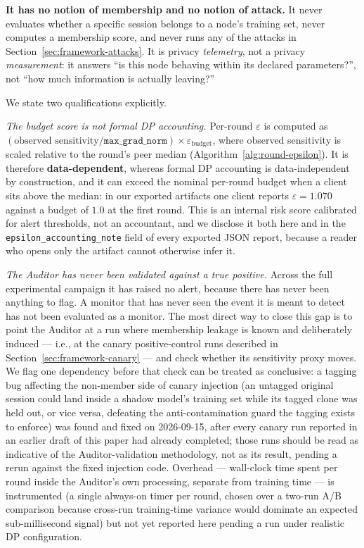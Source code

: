 \textbf{It has no notion of membership and no notion of attack.} It
never evaluates whether a specific session belongs to a node's training
set, never computes a membership score, and never runs any of the
attacks in Section~\ref{sec:framework-attacks}. It is privacy
\emph{telemetry}, not a privacy \emph{measurement}: it answers ``is
this node behaving within its declared parameters?'', not ``how much
information is actually leaving?''

We state two qualifications explicitly.

\emph{The budget score is not formal DP accounting.} Per-round
$\varepsilon$ is computed as
$(\text{observed sensitivity}/\texttt{max\_grad\_norm}) \times
\varepsilon_{\text{budget}}$, where observed sensitivity is scaled
relative to the round's peer median (Algorithm~\ref{alg:round-epsilon}).
It is therefore \textbf{data-dependent}, whereas formal DP accounting
is data-independent by construction, and it can exceed the nominal
per-round budget when a client sits above the median: in our exported
artifacts one client reports $\varepsilon = 1.070$ against a budget of
$1.0$ at the first round. This is an internal risk score calibrated
for alert thresholds, not an accountant, and we disclose it both here
and in the \texttt{epsilon\_accounting\_note} field of every exported
JSON report, because a reader who opens only the artifact cannot
otherwise infer it.

\emph{The Auditor has never been validated against a true positive.}
Across the full experimental campaign it has raised no alert, because
there has never been anything to flag. A monitor that has never seen
the event it is meant to detect has not been evaluated as a monitor.
The most direct way to close this gap is to point the Auditor at a run
where membership leakage is known and deliberately induced --- i.e.,
at the canary positive-control runs described in
Section~\ref{sec:framework-canary} --- and check whether its
sensitivity proxy moves. We flag one dependency before that check can
be treated as conclusive: a tagging bug affecting the non-member side
of canary injection (an untagged original session could land inside a
shadow model's training set while its tagged clone was held out, or
vice versa, defeating the anti-contamination guard the tagging exists
to enforce) was found and fixed on 2026-09-15, after every canary run
reported in an earlier draft of this paper had already completed;
those runs should be read as indicative of the Auditor-validation
methodology, not as its result, pending a rerun against the fixed
injection code. Overhead --- wall-clock time spent per round inside the
Auditor's own processing, separate from training time --- is
instrumented (a single always-on timer per round, chosen over a
two-run A/B comparison because cross-run training-time variance would
dominate an expected sub-millisecond signal) but not yet reported here
pending a run under realistic DP configuration.

